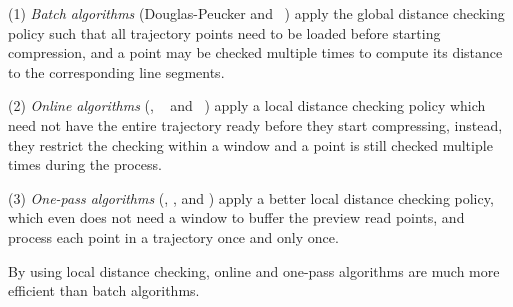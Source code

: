 \ni (1) {\em Batch algorithms} (Douglas-Peucker\cite{Douglas:Peucker,Meratnia:Spatiotemporal} and \pavlidis~\cite{Pavlidis:Segment}) apply the global distance checking policy such that all trajectory points need to be loaded before starting compression, and a point may be checked multiple times to compute its distance to the corresponding line segments.

\ni (2) {\em Online algorithms} (\opwa \cite{Meratnia:Spatiotemporal}, \bqsa~\cite{Liu:BQS} and \squishe~\cite{Muckell:SQUISH}) apply a local distance checking policy which need not have the entire trajectory ready before they start compressing, instead, they restrict the checking within a window and a point is still checked multiple times during the process.

\ni (3) {\em One-pass algorithms} (\operb\cite{Lin:Operb}, \siped  \cite{Williams:Longest,Sklansky:Cone,Dunham:Cone, Zhao:Sleeve}, \cised \cite{Lin:Cised} and \interval \cite{Ke:Interval}) apply a better local distance checking policy, which even does not need a window to buffer the preview read points, and process each point in a trajectory once and only once.

By using local distance checking, online and one-pass algorithms are much more efficient than batch algorithms.




